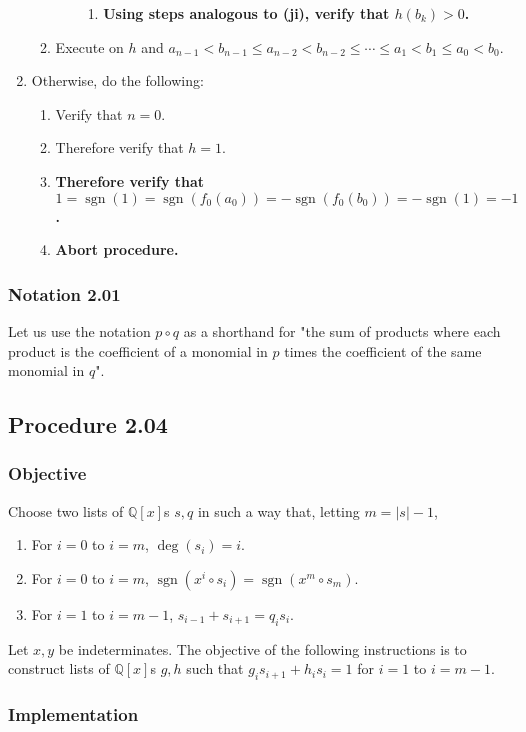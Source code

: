 \documentclass[twocolumn]{article}
\DeclareMathOperator{\sgn}{sgn}
\newcommand{\notation}[1]{\subsubsection*{Notation #1}}
\newcommand{\procedure}[2][]{\subsection*{Procedure #2 \ifthenelse{\equal{#1}{}}{}{(#1)}}\label{sec:procedure #2}}
\newcommand{\objective}{\subsubsection*{Objective}}
\newcommand{\implementation}{\subsubsection*{Implementation}}
\newcommand{\procedurehr}[2][]{\hyperref[sec:procedure #2]{\ifthenelse{\equal{#1}{}}{procedure #2}{#1}}}
\begin{document}
\begin{enumerate}
\begin{enumerate}
\begin{enumerate}
\begin{enumerate}
								\item \textbf{Using steps analogous to (ji), verify that $h(b_k)>0$.}
							\end{enumerate}
						\end{enumerate}
						\item Execute \procedurehr{2.03} on $h$ and $a_{n-1}<b_{n-1}\le a_{n-2}<b_{n-2}\le\cdots\le a_1<b_1\le a_0<b_0$.
					\end{enumerate}
					\item Otherwise, do the following:
					\begin{enumerate}
						\item Verify that $n=0$.
						\item Therefore verify that $h=1$.
						\item \textbf{Therefore verify that $1=\sgn(1)=\sgn(f_0(a_0))=-\sgn(f_0(b_0))=-\sgn(1)=-1$.}
						\item \textbf{Abort procedure.}
					\end{enumerate}
				\end{enumerate}
		\notation{2.01}
			Let us use the notation $p\circ q$ as a shorthand for "the sum of products where each product is the coefficient of a monomial in $p$ times the coefficient of the same monomial in $q$".
		\procedure{2.04}
			\objective
				Choose two lists of $\mathbb{Q}[x]$s $s,q$ in such a way that, letting $m=\lvert s\rvert-1$,
				\begin{enumerate}
					\item For $i=0$ to $i=m$, $\deg(s_i)=i$.
					\item For $i=0$ to $i=m$, $\sgn(x^i\circ s_i)=\sgn(x^m\circ s_m)$.
					\item For $i=1$ to $i=m-1$, $s_{i-1}+s_{i+1}=q_is_i$.
				\end{enumerate}
				Let $x,y$ be indeterminates. The objective of the following instructions is to construct lists of $\mathbb{Q}[x]$s $g,h$ such that $g_is_{i+1}+h_is_i=1$ for $i=1$ to $i=m-1$.
			\implementation
\end{document}
